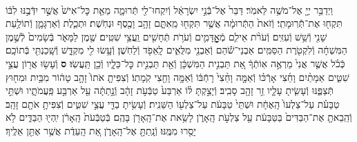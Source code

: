 \documentclass[twoside, openany, parskip=half, 11pt]{book}
\begin{document}
\begin{sometimes}
\begin{footnotesize}
\begin{multicols}{2}
\\
וַיְדַבֵּ֥ר יְיָ֖ אֶל־מֹשֶׁ֥ה לֵּאמֹֽר׃ דַּבֵּר֙ אֶל־בְּֿֿנֵ֣י יִשְׂרָאֵ֔ל וְֿיִקְחוּ־לִ֖י תְּֿרוּמָ֑ה מֵאֵ֤ת כׇּל־אִישׁ֙ אֲשֶׁ֣ר יִדְּֿבֶ֣נּוּ לִבּ֔וֹ תִּקְח֖וּ אֶת־תְּֿֿרֽוּמָתִֽי׃ וְֿזֹאת֙ הַתְּֿרוּמָ֔ה אֲשֶׁ֥ר תִּקְח֖וּ מֵֽאִתָּ֑ם זָהָ֥ב וָכֶ֖סֶף וּנְחֹֽשֶׁת׃ וּתְכֵ֧לֶת וְֿאַרְגָּמָ֛ן וְֿתוֹלַ֥עַת שָׁנִ֖י וְֿשֵׁ֥שׁ וְֿעִזִּֽים׃ וְֿעֹרֹ֨ת אֵילִ֧ם מְֿאׇׇׇׇׇׇׇׇׇׇׇׇָדָּמִ֛ים וְֿעֹרֹ֥ת תְּֿחָשִׁ֖ים וַֽעֲצֵ֥י שִׁטִּֽים׃  שֶׁ֖מֶן לַמָּאֹ֑ר בְּֿשָׂמִים֙ לְֿשֶׁ֣מֶן הַמִּשְׁחָ֔ה וְֿלִקְטֹ֖רֶת הַסַּמִּֽים׃ אַבְנֵי־שֹׁ֕הַם וְֿאַבְנֵ֖י מִלֻּאִ֑ים לָֽאֵפֹ֖ד וְֿלַחֹֽשֶׁן׃ וְֿעָ֥שׂוּ לִ֖י מִקְדָּ֑שׁ וְֿשָֽׁכַנְתִּ֖י בְּֿתוֹכָֽם׃ כְּֿכֹ֗ל אֲשֶׁ֤ר אֲנִי֙ מַרְאֶ֣ה אֽוֹתְֿךָ֔ אֵ֚ת תַּבְנִ֣ית הַמִּשְׁכָּ֔ן וְֿאֵ֖ת תַּבְנִ֣ית כׇּל־כֵּלָ֑יו וְֿכֵ֖ן תַּֽעֲשֽׂוּ׃ \textbf{ס}  וְֿעָשׂ֥וּ אֲר֖וֹן עֲצֵ֣י שִׁטִּ֑ים אַמָּתַ֨יִם וָחֵ֜צִי אָרְֿכּ֗וֹ וְֿאַמָּ֤ה וָחֵ֨צִי֙ רָחְֿבּ֔וֹ וְֿאַמָּ֥ה וָחֵ֖צִי קֹֽמָתֽוֹ׃ וְֿצִפִּיתָ֤ אֹתוֹ֙ זָהָ֣ב טָה֔וֹר מִבַּ֥יִת וּמִח֖וּץ תְּֿצַפֶּ֑נּוּ וְֿעָשִׂ֧יתָ עָלָ֛יו זֵ֥ר זָהָ֖ב סָבִֽיב׃ וְֿיָצַ֣קְתָּ לּ֗וֹ אַרְבַּע֙ טַבְּֿעֹ֣ת זָהָ֔ב וְֿנָ֣תַתָּ֔ה עַ֖ל אַרְבַּ֣ע פַּֽעֲמֹתָ֑יו וּשְׁתֵּ֣י טַבָּעֹ֗ת עַל־צַלְעוֹ֙ הָֽאֶחָ֔ת וּשְׁתֵּי֙ טַבָּעֹ֔ת עַל־צַלְע֖וֹ הַשֵּׁנִֽית׃ וְֿעָשִׂ֥יתָ בַדֵּ֖י עֲצֵ֣י שִׁטִּ֑ים וְֿצִפִּיתָ֥ אֹתָ֖ם זָהָֽב׃ וְֿהֵֽבֵאתָ֤ אֶת־הַבַּדִּים֙ בַּטַּבָּעֹ֔ת עַ֖ל צַלְעֹ֣ת הָֽאָרֹ֑ן לָשֵׂ֥את אֶת־הָֽאָרֹ֖ן בָּהֶֽם׃ בְּֿטַבְּֿעֹת֙ הָֽאָרֹ֔ן יִֽהְי֖וּ הַבַּדִּ֑ים לֹ֥א יָסֻ֖רוּ מִמֶּֽנּוּ׃ וְֿנָֽתַתָּ֖ אֶל־הָֽאָרֹ֑ן אֵ֚ת הָֽעֵדֻ֔ת אֲשֶׁ֥ר אֶתֵּ֖ן אֵלֶֽיךָ׃


\end{multicols}
\end{footnotesize}
\end{sometimes}
\end{document}

